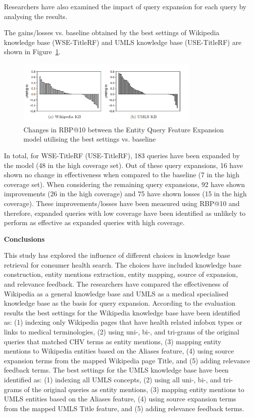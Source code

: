 \documentclass[]{article}
\begin{document}
Researchers have also examined the impact of query expansion for each query by analysing the results.  

The gains/losses vs. baseline obtained by the best settings of Wikipedia knowledge base (WSE-TitleRF) and UMLS knowledge base (USE-TitleRF) are shown in Figure~\ref{fig33}.

\begin{figure}[b!]
	\includegraphics[width=0.8\textwidth]{Capture33.png}
	\caption{Changes in RBP@10 between the Entity Query Feature Expansion model utilising the best settings vs. baseline \label{fig33}}
\end{figure} 

In total, for WSE-TitleRF (USE-TitleRF), 183 queries have been expanded by the model (48 in the high coverage set). Out of these query expansions, 16 have shown no change in effectiveness when compared to the baseline (7 in the high coverage set). When considering the remaining query expansions, 92 have shown improvements (26 in the high coverage) and 75 have shown losses (15 in the high coverage). These improvements/losses have been measured using RBP@10 and therefore, expanded queries with low coverage have been identified as unlikely to perform as effective as expanded queries with high coverage.    

\textbf{Conclusions} 

This study has explored the influence of different choices in knowledge base retrieval for consumer health search. The choices have included knowledge base construction, entity mentions extraction, entity mapping, source of expansion, and relevance feedback. The researchers have compared the effectiveness of Wikipedia as a general knowledge base and UMLS as a medical specialised knowledge base as the basis for query expansion. According to the evaluation results the best settings for the Wikipedia knowledge base have been identified as: (1) indexing only Wikipedia pages that have health related infobox types or links to medical terminologies, (2) using uni-, bi-, and tri-grams of the original queries that matched CHV terms as entity mentions, (3) mapping entity mentions to Wikipedia entities based on the Aliases feature, (4) using source expansion terms from the mapped Wikipedia page Title, and (5) adding relevance feedback terms. The best settings for the UMLS knowledge base have been identified as: (1) indexing all UMLS concepts, (2) using all uni-, bi-, and tri-grams of the original queries as entity mentions, (3) mapping entity mentions to UMLS entities based on the Aliases feature, (4) using source expansion terms from the mapped UMLS Title feature, and (5) adding relevance feedback terms.    
\end{document}
